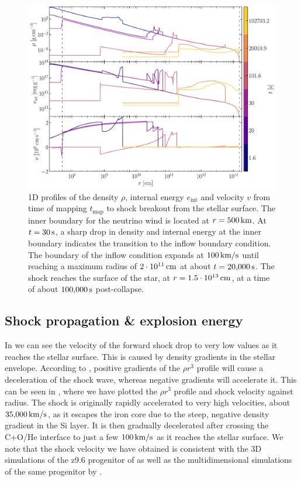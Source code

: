 \begin{figure}[ht!]
    \centering
    \includegraphics[width=1.0\linewidth]{figures/long_1d.pdf}
    \caption{1D profiles of the density \(\rho\), internal energy \(e_\mathrm{int}\) and velocity \(v\) from time of mapping \(t_\mathrm{map}\) to shock breakout from the stellar surface. The inner boundary for the neutrino wind is located at \(r=500\,\mathrm{km}\). At \(t = 30\,\mathrm{s}\), a sharp drop in density and internal energy at the inner boundary indicates the transition to the inflow boundary condition. The boundary of the inflow condition expands at \(100\,\mathrm{km/s}\) until reaching a maximum radius of \(2 \cdot 10^{11}\,\mathrm{cm}\) at about \(t=20{,}000\,\mathrm{s}\). The shock reaches the surface of the star, at \(r=1.5 \cdot 10^{13}\,\mathrm{cm}\), at a time of about \(100{,}000\,\mathrm{s}\) post-collapse.}
    \label{fig:long_1d}
\end{figure}

\clearpage

\subsection{Shock propagation \& explosion energy}

In  we can see the velocity of the forward shock drop to very low values as it reaches the stellar surface. This is caused by density gradients in the stellar envelope. According to \cite{Sedov1959}, positive gradients of the \(\rho r^3\) profile will cause a deceleration of the shock wave, whereas negative gradients will accelerate it. This can be seen in , where we have plotted the \(\rho r^3\) profile and shock velocity against radius. The shock is originally rapidly accelerated to very high velocities, about \(35{,}000\,\mathrm{km/s}\), as it escapes the iron core due to the steep, negative density gradient in the Si layer. It is then gradually decelerated after crossing the C+O/He interface to just a few \(100\,\mathrm{km/s}\) as it reaches the stellar surface. We note that the shock velocity we have obtained is consistent with the 3D simulations of the z9.6 progenitor of \cite{Stockinger2020} as well as the multidimensional simulations of the same progenitor by \cite{Sandoval2021}.

